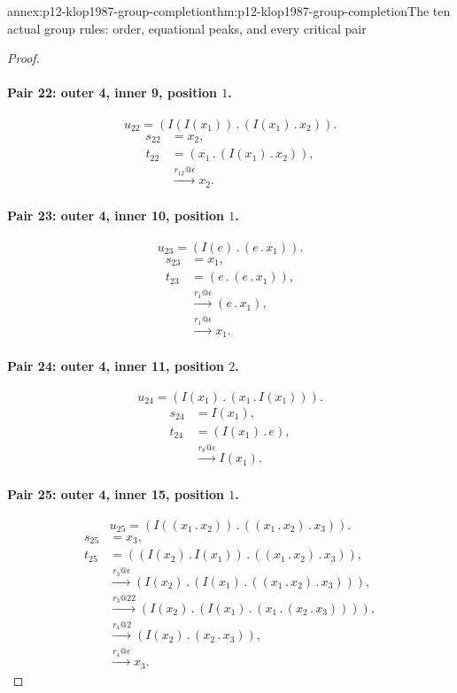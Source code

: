 \begin{annexitem}{annex:p12-klop1987-group-completion}{thm:p12-klop1987-group-completion}{The ten actual group rules: order, equational peaks, and every critical pair}
\begin{proof}
\paragraph{Pair 22: outer 4, inner 9, position \(1\).}
\[
 u_{22}=(I(I(x_{1}))\mathbin{.}(I(x_{1})\mathbin{.}x_{2})).
\]
\begin{align*}
 s_{22}&=x_{2},\\
 t_{22}&=(x_{1}\mathbin{.}(I(x_{1})\mathbin{.}x_{2})),\\
 &\xrightarrow{r_{12}@\epsilon}x_{2}.
\end{align*}

\paragraph{Pair 23: outer 4, inner 10, position \(1\).}
\[
 u_{23}=(I(e)\mathbin{.}(e\mathbin{.}x_{1})).
\]
\begin{align*}
 s_{23}&=x_{1},\\
 t_{23}&=(e\mathbin{.}(e\mathbin{.}x_{1})),\\
 &\xrightarrow{r_{1}@\epsilon}(e\mathbin{.}x_{1}),\\
 &\xrightarrow{r_{1}@\epsilon}x_{1}.
\end{align*}

\paragraph{Pair 24: outer 4, inner 11, position \(2\).}
\[
 u_{24}=(I(x_{1})\mathbin{.}(x_{1}\mathbin{.}I(x_{1}))).
\]
\begin{align*}
 s_{24}&=I(x_{1}),\\
 t_{24}&=(I(x_{1})\mathbin{.}e),\\
 &\xrightarrow{r_{8}@\epsilon}I(x_{1}).
\end{align*}

\paragraph{Pair 25: outer 4, inner 15, position \(1\).}
\[
 u_{25}=(I((x_{1}\mathbin{.}x_{2}))\mathbin{.}((x_{1}\mathbin{.}x_{2})\mathbin{.}x_{3})).
\]
\begin{align*}
 s_{25}&=x_{3},\\
 t_{25}&=((I(x_{2})\mathbin{.}I(x_{1}))\mathbin{.}((x_{1}\mathbin{.}x_{2})\mathbin{.}x_{3})),\\
 &\xrightarrow{r_{3}@\epsilon}(I(x_{2})\mathbin{.}(I(x_{1})\mathbin{.}((x_{1}\mathbin{.}x_{2})\mathbin{.}x_{3}))),\\
 &\xrightarrow{r_{3}@22}(I(x_{2})\mathbin{.}(I(x_{1})\mathbin{.}(x_{1}\mathbin{.}(x_{2}\mathbin{.}x_{3})))),\\
 &\xrightarrow{r_{4}@2}(I(x_{2})\mathbin{.}(x_{2}\mathbin{.}x_{3})),\\
 &\xrightarrow{r_{4}@\epsilon}x_{3}.
\end{align*}


\end{proof}
\end{annexitem}
